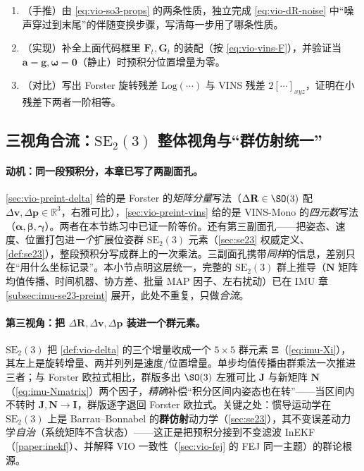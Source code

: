 \begin{practice}
\begin{enumerate}
  \item （手推）由 \cref{eq:vio-so3-props} 的两条性质，独立完成 \cref{eq:vio-dR-noise} 中“噪声穿过到末尾”的伴随变换步骤，写清每一步用了哪条性质。
  \item （实现）补全上面代码框里 $\mathbf{F}_t,\mathbf{G}_t$ 的装配（按 \cref{eq:vio-vins-F}），并验证当 $\mathbf{a}=\mathbf{g},\boldsymbol{\omega}=\mathbf{0}$（静止）时预积分位置增量为零。
  \item （对比）写出 Forster 旋转残差 $\mathrm{Log}(\cdots)$ 与 VINS 残差 $2[\cdots]_{xyz}$，证明在小残差下两者一阶相等。
\end{enumerate}
\end{practice}

\subsection{三视角合流：\texorpdfstring{$\mathrm{SE}_2(3)$}{SE2(3)} 整体视角与“群仿射统一”}
\label{subsec:vio-se23-unify}

\paragraph{动机：同一段预积分，本章已写了两副面孔。}
\cref{sec:vio-preint-delta} 给的是 Forster 的\emph{矩阵分量}写法（$\Delta\mathbf R\in\SO(3)$ 配 $\Delta\mathbf v,\Delta\mathbf p\in\mathbb R^3$，右雅可比），\cref{sec:vio-preint-vins} 给的是 VINS-Mono 的\emph{四元数}写法（$\boldsymbol\alpha,\boldsymbol\beta,\boldsymbol\gamma$）。两者在本节练习中已证一阶等价。还有第三副面孔——把姿态、速度、位置打包进\emph{一个}扩展位姿群 $\mathrm{SE}_2(3)$ 元素（\cref{sec:se23} 权威定义、\cref{def:se23}），整段预积分写成群上的一次乘法。三副面孔携带\emph{同样}的信息，差别只在“用什么坐标记录”。本小节点明这层统一，完整的 $\mathrm{SE}_2(3)$ 群上推导（$\mathbf N$ 矩阵均值传播、时间机器、协方差、批量 MAP 因子、左右扰动）已在 IMU 章 \cref{subsec:imu-se23-preint} 展开，此处不重复，只做\emph{合流}。

\paragraph{第三视角：把 $\Delta\mathbf R,\Delta\mathbf v,\Delta\mathbf p$ 装进一个群元素。}
$\mathrm{SE}_2(3)$ 把 \cref{def:vio-delta} 的三个增量收成一个 $5\times5$ 群元素 $\boldsymbol\Xi$（\cref{eq:imu-Xi}），其左上是旋转增量、两并列列是速度/位置增量。单步均值传播由群乘法一次推进三者；与 Forster 欧拉式相比，群版多出 $\SO(3)$ 左雅可比 $\mathbf J$ 与新矩阵 $\mathbf N$（\cref{eq:imu-Nmatrix}）两个因子，\emph{精确}补偿“积分区间内姿态也在转”——当区间内不转时 $\mathbf J,\mathbf N\to\mathbf I$，群版逐字退回 Forster 欧拉式。关键之处：惯导运动学在 $\mathrm{SE}_2(3)$ 上是 Barrau--Bonnabel 的\textbf{群仿射}动力学（\cref{sec:se23}），其不变误差动力学\emph{自治}（系统矩阵不含状态）——这正是把预积分接到不变滤波 InEKF（\cref{paper:inekf}）、并解释 VIO 一致性（\cref{sec:vio-fej} 的 FEJ 同一主题）的群论根源。

